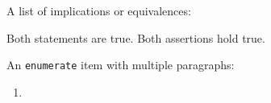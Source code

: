 A list of implications or equivalences:
\begin{implist}
		Both statements are true.
		Both assertions hold true.
\end{implist}
An \texttt{enumerate} item with multiple paragraphs:
\begin{enumerate}
	\item
		\lipsum[1-2]
\end{enumerate}
